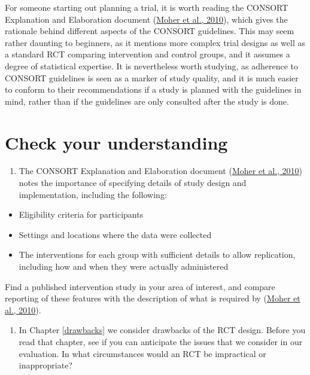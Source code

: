 \documentclass{krantz}
\providecommand{\tightlist}{%
\setlength{\itemsep}{0pt}\setlength{\parskip}{0pt}}
\begin{document}
For someone starting out planning a trial, it is worth reading the CONSORT Explanation and Elaboration document (\protect\hyperlink{ref-moher2010}{Moher et al., 2010}), which gives the rationale behind different aspects of the CONSORT guidelines. This may seem rather daunting to beginners, as it mentions more complex trial designs as well as a standard RCT comparing intervention and control groups, and it assumes a degree of statistical expertise. It is nevertheless worth studying, as adherence to CONSORT guidelines is seen as a marker of study quality, and it is much easier to conform to their recommendations if a study is planned with the guidelines in mind, rather than if the guidelines are only consulted after the study is done.

\hypertarget{check-your-understanding-9}{%
\section{Check your understanding}\label{check-your-understanding-9}}

\begin{enumerate}
\def\labelenumi{\arabic{enumi}.}
\tightlist
\item
  The CONSORT Explanation and Elaboration document (\protect\hyperlink{ref-moher2010}{Moher et al., 2010}) notes the importance of specifying details of study design and implementation, including the following:
\end{enumerate}

\begin{itemize}
\tightlist
\item
  Eligibility criteria for participants\\
\item
  Settings and locations where the data were collected\\
\item
  The interventions for each group with sufficient details to allow replication, including how and when they were actually administered
\end{itemize}

Find a published intervention study in your area of interest, and compare reporting of these features with the description of what is required by (\protect\hyperlink{ref-moher2010}{Moher et al., 2010}).

\begin{enumerate}
\def\labelenumi{\arabic{enumi}.}
\setcounter{enumi}{1}
\tightlist
\item
  In Chapter \ref{drawbacks} we consider drawbacks of the RCT design. Before you read that chapter, see if you can anticipate the issues that we consider in our evaluation. In what circumstances would an RCT be impractical or inappropriate?
\end{enumerate}
\end{document}

